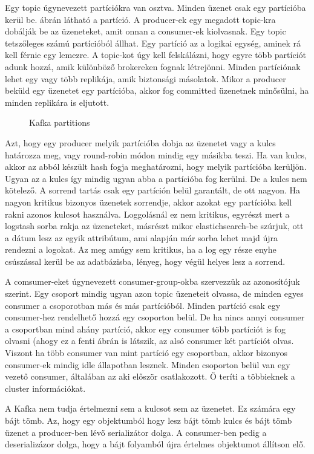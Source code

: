 Egy topic úgynevezett partíciókra van osztva. Minden üzenet csak egy partícióba kerül be.  ábrán látható a partíció.
A producer-ek egy megadott topic-kra dobálják be az üzeneteket, amit onnan a consumer-ek kiolvasnak. Egy topic tetszőleges számú partícióból állhat. Egy partíció az a logikai egység, aminek rá kell férnie egy lemezre. A topic-kot úgy kell felskálázni, hogy egyre több partíciót adunk hozzá, amik különböző brokereken fognak létrejönni. Minden partíciónak lehet egy vagy több replikája, amik biztonsági másolatok. Mikor a producer beküld egy üzenetet egy partícióba, akkor fog committed üzenetnek minősülni, ha minden replikára is eljutott.
\begin{figure}[ht]
	\centering
	\caption{Kafka partitions} 
	\label{fig:kafka-partitions}
\end{figure}
Azt, hogy egy producer melyik partícióba dobja az üzenetet vagy a kulcs határozza meg, vagy round-robin módon mindig egy másikba teszi. Ha van kulcs, akkor az abból készült hash fogja meghatározni, hogy melyik partícióba kerüljön. Ugyan az a kulcs így mindig ugyan abba a partícióba fog kerülni. De a kulcs nem kötelező. A sorrend tartás csak egy partíción belül garantált, de ott nagyon. Ha nagyon kritikus bizonyos üzenetek sorrendje, akkor azokat egy partícióba kell rakni azonos kulcsot használva. Loggolásnál ez nem kritikus, egyrészt mert a logstash sorba rakja az üzeneteket, másrészt mikor elastichsearch-be szúrjuk, ott a dátum lesz az egyik attribútum, ami alapján már sorba lehet majd újra rendezni a logokat. Az meg amúgy sem kritikus, ha a log egy része enyhe csúszással kerül be az adatbázisba, lényeg, hogy végül helyes lesz a sorrend.

A comsumer-eket úgynevezett consumer-group-okba szervezzük az azonosítójuk szerint. Egy csoport mindig ugyan azon topic üzeneteit olvassa, de minden egyes consumer a csoporotban más és más partícióból. Minden partíció csak egy consumer-hez rendelhető hozzá egy csoporton belül. De ha nincs annyi consumer a csoportban mind ahány partíció, akkor egy consumer több partíciót is fog olvasni (ahogy ez a fenti ábrán is látszik, az alsó consumer két partíciót olvas. Viszont ha több consumer van mint partíció egy csoportban, akkor bizonyos consumer-ek mindig idle állapotban lesznek. Minden csoporton belül van egy vezető consumer, általában az aki először csatlakozott. Ő teríti a többieknek a cluster információkat.

A Kafka nem tudja értelmezni sem a kulcsot sem az üzenetet. Ez számára egy bájt tömb. Az, hogy egy objektumból hogy lesz bájt tömb kulcs és bájt tömb üzenet a producer-ben lévő serializátor dolga. A consumer-ben pedig a deserializázor dolga, hogy a bájt folyamból újra értelmes objektumot állítson elő.

